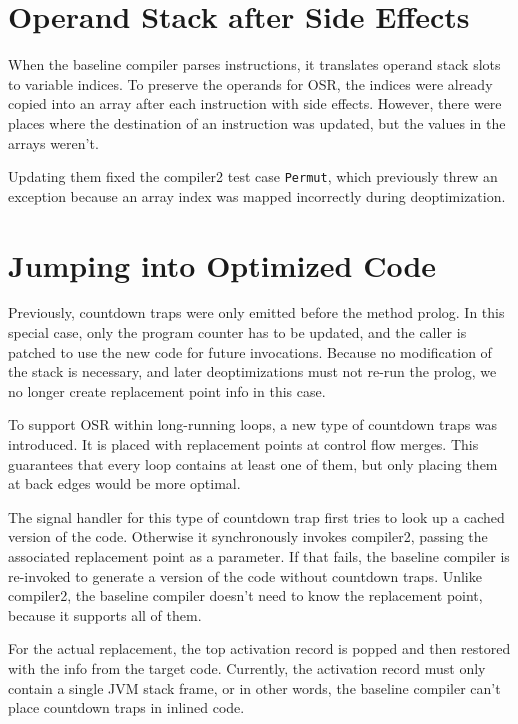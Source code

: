\documentclass[draft,final]{vutinfth} %
\begin{document}
    \section{Operand Stack after Side Effects}

    When the baseline compiler parses instructions,
    it translates operand stack slots to variable indices.
    To preserve the operands for OSR, the indices were already copied into an array after each instruction with side effects.
    However, there were places where the destination of an instruction was updated, but the values in the arrays weren't.

    Updating them fixed the compiler2 test case \lstinline{Permut},
    which previously threw an exception because an array index was mapped incorrectly during deoptimization.


    \section{Jumping into Optimized Code}

    Previously, countdown traps were only emitted before the method prolog.
    In this special case, only the program counter has to be updated, and
    the caller is patched to use the new code for future invocations.
    Because no modification of the stack is necessary,
    and later deoptimizations must not re-run the prolog,
    we no longer create replacement point info in this case.

    To support OSR within long-running loops,
    a new type of countdown traps was introduced.
    It is placed with replacement points at control flow merges.
    This guarantees that every loop contains at least one of them,
    but only placing them at back edges would be more optimal.

    The signal handler for this type of countdown trap first tries to look up a cached
    version of the code.
    Otherwise it synchronously invokes compiler2,
    passing the associated replacement point as a parameter.
    If that fails, the baseline compiler is re-invoked to generate a version of the code without countdown traps.
    Unlike compiler2, the baseline compiler doesn't need to know the replacement point, because it supports all of them.

    For the actual replacement, the top activation record is popped
    and then restored with the info from the target code.
    Currently, the activation record must only contain a single JVM stack frame,
    or in other words,
    the baseline compiler can't place countdown traps in inlined code.
\end{document}
